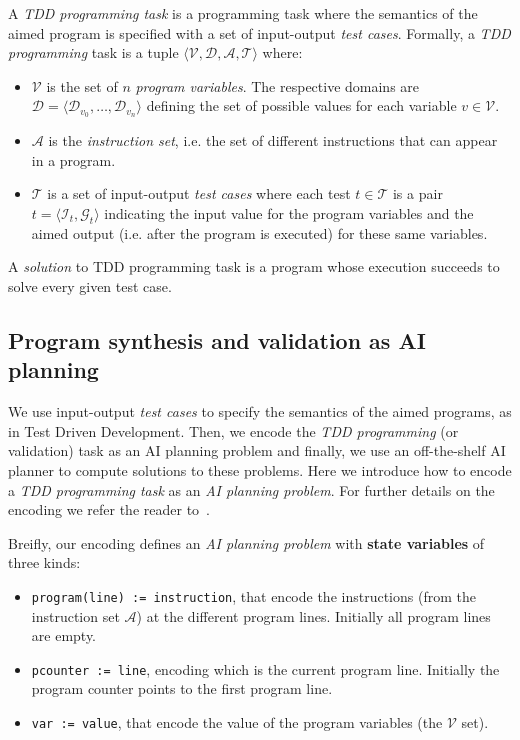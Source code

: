 \documentclass[10pt,a4paper]{paper}
\newcommand{\tup}[1]{{\langle #1 \rangle}}
\begin{document}
A {\em TDD programming task} is a programming task where the semantics of the aimed program is specified with a set of input-output {\em test cases}. Formally, a {\em TDD programming} task is a tuple $\tup{{\mathcal V},{\mathcal D},{\mathcal A}, {\mathcal T}}$ where:
\begin{itemize}
\item ${\mathcal V}$ is the set of $n$ {\em program variables}. The respective domains are ${\mathcal D}=\tup{{\mathcal D}_{v_0}, \ldots, {\mathcal D}_{v_n}}$ defining the set of possible values for each variable $v\in {\mathcal V}$.
\item ${\mathcal A}$ is the {\em instruction set}, i.e. the set of different instructions that can appear in a program.
\item ${\mathcal T}$ is a set of input-output {\em test cases} where each test $t\in {\mathcal T}$ is a pair $t=\tup{{\mathcal I}_t,{\mathcal G}_t}$ indicating the input value for the program variables and the aimed output (i.e. after the program is executed) for these same variables.
\end{itemize}
A {\em solution} to TDD programming task is a program whose execution succeeds to solve every given test case.


\subsection{Program synthesis and validation as AI planning}
We use input-output {\em test cases} to specify the semantics of the aimed programs, as in Test Driven Development. Then, we encode the {\em TDD programming} (or validation) task as an AI planning problem and finally, we use an off-the-shelf AI planner to compute solutions to these problems. Here we introduce how to encode a {\em TDD programming task} as an {\em AI planning problem}. For further details on the encoding we refer the reader to~\cite{jimenez2015computing,sergio:aprograming:icaps16,sergio:aprogramingb:ijcai16,sergio:aprograming:ijcai16,segovia2017generating,segovia:FSC:JAIR2018,segovia:programs:AIJ19}.

Breifly, our encoding defines an {\em AI planning problem} with {\bf state variables} of three kinds:
\begin{itemize}
\item {\tt program(line) := instruction}, that encode the instructions (from the instruction set ${\mathcal A}$) at the different program lines. Initially all program lines are empty.
\item {\tt pcounter := line}, encoding which is the current program line. Initially the program counter points to the first program line.
\item {\tt var := value}, that encode the value of the program variables (the ${\mathcal V}$ set).
\end {itemize}
\end{document}
